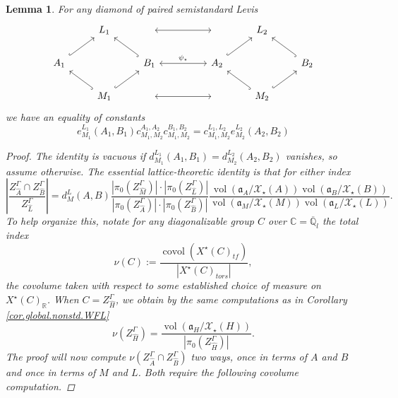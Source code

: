 \documentclass[openany]{amsbook}
\newtheorem{lemma}[theorem]{Lemma}
\theoremstyle{definition}
\theoremstyle{remark}
\numberwithin{equation}{section}
\newcommand{\R}{\mathbb{R}}
\newcommand{\Q}{\mathbb{Q}}
\newcommand{\C}{\mathbb{C}}
\newcommand{\cX}{\mathcal{X}}
\newcommand{\ol}[1]{\overline{#1}}
\newcommand{\vol}{\operatorname{vol}}
\renewcommand{\-}{\operatorname{-}}
\renewcommand{\a}{\mathfrak{a}}
\newcommand{\on}[1]{\operatorname{#1}}
\newcommand{\tors}{\mathit{tors}}
\newcommand{\tf}{\mathit{tf}}
\begin{document}
\begin{lemma}\label{lem.e.compat.c}
    For any diamond of paired semistandard Levis
    $$
        \begin{tikzcd}
            & L_1 & \; \ar[rr, leftrightarrow] & & \; & L_2 & \\
            A_1 \ar[ur, hook] & & B_1 \ar[ul, hook] \ar[rr, leftrightarrow, "\psi_\star"] & & A_2\ar[ur, hook] & & B_2\ar[ul, hook] \\
            & M_1\ar[ur, hook] \ar[ul, hook] & \;\ar[rr, leftrightarrow] & & \; & M_2\ar[ur, hook]\ar[ul, hook] &
        \end{tikzcd}
    $$
    we have an equality of constants $$
            e_{M_1}^{L_1}(A_1, B_1) c_{M_1, M_2}^{A_1, A_2} c_{M_1, M_2}^{B_1, B_2}  = c_{M_1, M_2}^{L_1, L_2} e_{M_2}^{L_2}(A_2, B_2)
        $$
    \begin{proof}
        The identity is vacuous if $d_{M_1}^{L_1}(A_1, B_1) = d_{M_2}^{L_2}(A_2, B_2)$ vanishes, so assume otherwise. The essential lattice-theoretic identity is that for either index
        \begin{equation}
            \left|\frac{Z_{\widehat{A}}^\Gamma \cap Z_{\widehat{B}}^\Gamma}{Z_{\widehat{L}}^\Gamma} \right| = d_M^L(A,B) \frac{|\pi_0(Z^\Gamma_{\widehat{M}})| \cdot |\pi_0(Z^\Gamma_{\widehat{L}})|}{|\pi_0(Z^\Gamma_{\widehat{A}})| \cdot |\pi_0(Z^\Gamma_{\widehat{B}})|} \frac{\vol(\a_{A}/\cX_\star(A)) \vol(\a_{B}/\cX_\star(B))}{\vol(\a_{M}/\cX_\star(M)) \vol(\a_{L}/\cX_\star(L))}.\label{eqn.lattice.comp.ABML}
        \end{equation}
        To help organize this, notate for any diagonalizable group $C$ over $\C = \ol{\Q}_l$ the total index
        $$
            \nu(C) := \frac{\on{covol}(X^\star(C)_{\tf})}{|X^\star(C)_{\tors}|},
        $$
        the covolume taken with respect to some established choice of measure on $X^\star(C)_{\R}$. When $C = Z_{\widehat{H}}^\Gamma$, we obtain by the same computations as in Corollary \ref{cor.global.nonstd.WFL}
        $$
            \nu(Z_{\widehat{H}}^\Gamma) = \frac{\vol(\a_H/\cX_\star(H))}{|\pi_0(Z_{\widehat{H}}^\Gamma)|}.
        $$
        The proof will now compute $\nu(Z_{\widehat{A}}^\Gamma \cap Z_{\widehat{B}}^\Gamma)$ two ways, once in terms of $A$ and $B$ and once in terms of $M$ and $L$. Both require the following covolume computation.


\end{proof}
\end{lemma}
\end{document}
